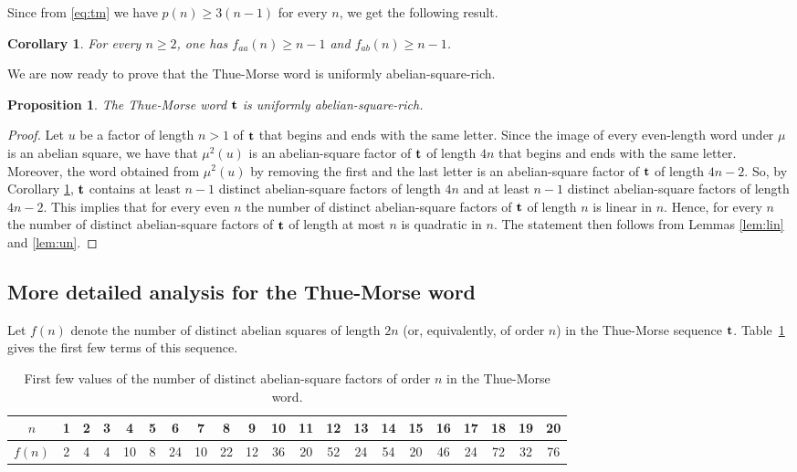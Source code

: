 \documentclass[11pt,reqno]{amsart}
\numberwithin{equation}{section}
\theoremstyle{plain}
\newtheorem{corollary}[theorem]{Corollary}
\newtheorem{proposition}[theorem]{Proposition}
\theoremstyle{definition}
\theoremstyle{remark}
\begin{document}
Since from \eqref{eq:tm} we have $p(n)\geq 3(n-1)$ for every $n$, we get the following result.

\begin{corollary}\label{cor:TM}
  For every $n\geq 2$, one has $f_{aa}(n)\geq  n-1$ and $f_{ab}(n)\geq  n-1$.
\end{corollary}

We are now ready to prove that the Thue-Morse word is uniformly abelian-square-rich.

\begin{proposition}
 The Thue-Morse word $\bf t$ is uniformly abelian-square-rich.
\end{proposition}

\begin{proof}
 Let $u$ be a factor of length $n>1$ of $\bf t$ that begins and ends with the same letter. Since the image of every even-length word under $\mu$ is an abelian square, we have that $\mu^2(u)$ is an abelian-square factor of $\bf t$ of length $4n$ that begins and ends with the same letter. Moreover, the word obtained from $\mu^2(u)$ by removing the first and the last letter  is an abelian-square factor of $\bf t$ of length $4n-2$. So, by Corollary \ref{cor:TM}, $\bf t$ contains at least $n-1$ distinct abelian-square factors of length $4n$ and at least $n-1$ distinct abelian-square factors of length $4n-2$. This implies that for every even $n$ the number of distinct abelian-square factors of $\bf t$ of length $n$ is linear in $n$. Hence, for every $n$ the number of distinct abelian-square factors of $\bf t$ of length at most $n$ is quadratic in $n$. The statement then follows from Lemmas \ref{lem:lin} and \ref{lem:un}.
\end{proof}

\subsection{More detailed analysis for the Thue-Morse word}

Let $f(n)$ denote the number of distinct abelian squares of length
$2n$ (or, equivalently, of order $n$) in the Thue-Morse sequence $\bf t$.
Table~\ref{tabb1} gives the first few terms of this sequence.

\medskip

\begin{table}[H]
\begin{center}
\begin{tabular}{|c|cccccccccccccccccccc}
$n$ & 1& 2& 3& 4& 5& 6& 7& 8& 9&10&11&12&13&14&15&16&17&18&19&20 \\
\hline
$f(n)$ & 2& 4& 4&10& 8&24&10&22&12&36&20&52&24&54&20&46&24&72&32&76 \\
\end{tabular}
\end{center}
\caption{\label{tabb1} First few values of the number of distinct abelian-square factors of order $n$ in the Thue-Morse word.}
\end{table}
\end{document}
